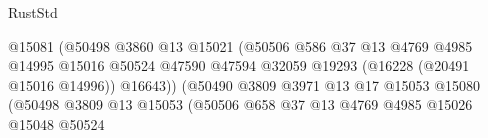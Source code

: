 \begin{lexlean}{RustStd}
\begin{coremodule}
                                                        @15081
                                                        (@50498
                                                          @3860
                                                          @13
                                                          @15021
                                                          (@50506
                                                            @586
                                                            @37
                                                            @13
                                                            @4769
                                                            @4985
                                                            @14995
                                                            @15016
                                                            @50524
                                                            @47590
                                                            @47594
                                                            @32059
                                                            @19293
                                                            (@16228 (@20491 @15016 @14996))
                                                            @16643))
                                                        (@50490
                                                          @3809
                                                          @3971
                                                          @13
                                                          @17
                                                          @15053
                                                          @15080
                                                          (@50498
                                                            @3809
                                                            @13
                                                            @15053
                                                            (@50506
                                                              @658
                                                              @37
                                                              @13
                                                              @4769
                                                              @4985
                                                              @15026
                                                              @15048
                                                              @50524

\end{coremodule}
\end{lexlean}
